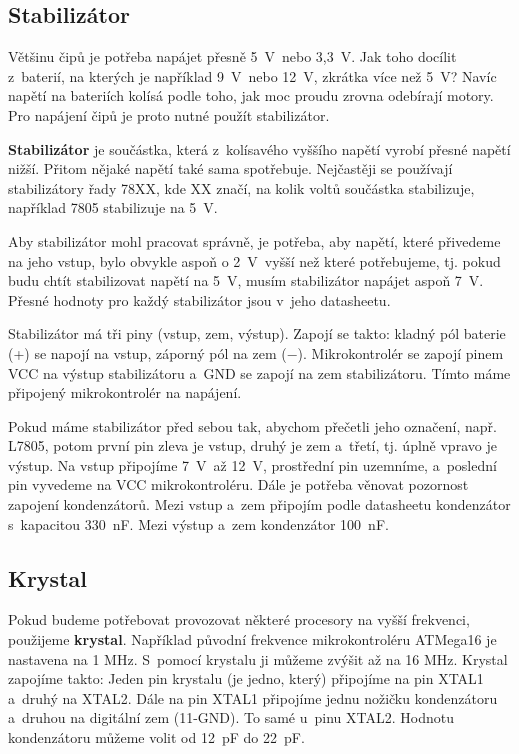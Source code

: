 \subsection{Stabilizátor}  \label{stabilizator}

Většinu čipů je potřeba napájet přesně 5~V~nebo 3,3~V. Jak toho docílit z~baterií, na kterých je například 9~V~nebo 12~V, zkrátka více než 5~V? 
Navíc napětí na bateriích kolísá podle toho, jak moc proudu zrovna odebírají motory. 
Pro napájení čipů je proto nutné použít stabilizátor. 

{\bf Stabilizátor} je součástka, která z~kolísavého vyššího napětí vyrobí přesné napětí nižší. Přitom nějaké napětí také sama spotřebuje. 
Nejčastěji se používají stabilizátory řady 78XX, kde XX značí, na kolik voltů součástka stabilizuje, například 7805 stabilizuje na 5~V.  \label{7805}

Aby stabilizátor mohl pracovat správně, je potřeba, aby napětí, které přivedeme na jeho vstup,
 bylo obvykle aspoň o 2~V~vyšší než které potřebujeme, tj. pokud budu chtít stabilizovat napětí na 5~V, 
 musím stabilizátor napájet aspoň 7~V. Přesné hodnoty pro každý stabilizátor jsou v~jeho datasheetu. 

Stabilizátor má tři piny (vstup, zem, výstup). Zapojí se takto: kladný pól baterie (+) se napojí na vstup, záporný pól na zem ($-$). 
Mikrokontrolér se zapojí pinem VCC na výstup stabilizátoru a~GND  se zapojí na zem stabilizátoru. 
Tímto máme připojený mikrokontrolér na napájení.


Pokud máme stabilizátor před sebou tak, abychom přečetli jeho označení, např. L7805, 
potom první pin zleva je vstup, druhý je zem a~třetí, tj. úplně vpravo je výstup. 
Na vstup připojíme 7~V~až 12~V, prostřední pin uzemníme, a~poslední pin vyvedeme na VCC mikrokontroléru. 
Dále je potřeba věnovat pozornost zapojení kondenzátorů. 
Mezi vstup a~zem připojím podle datasheetu kondenzátor s~kapacitou 330~nF. Mezi výstup a~zem kondenzátor 100~nF. 


\subsection{Krystal}
Pokud budeme potřebovat provozovat některé procesory na vyšší frekvenci, použijeme {\bf krystal}. 
Například původní frekvence mikrokontroléru ATMega16 je nastavena na 1 MHz. S~pomocí krystalu ji můžeme zvýšit až na 16 MHz. 
Krystal zapojíme takto: Jeden pin krystalu (je jedno, který) připojíme na pin XTAL1 a~druhý na XTAL2. 
Dále na pin XTAL1 připojíme jednu nožičku kondenzátoru a~druhou na digitální zem (11-GND). 
To samé u~pinu XTAL2. Hodnotu kondenzátoru můžeme volit od 12~pF do 22~pF.



